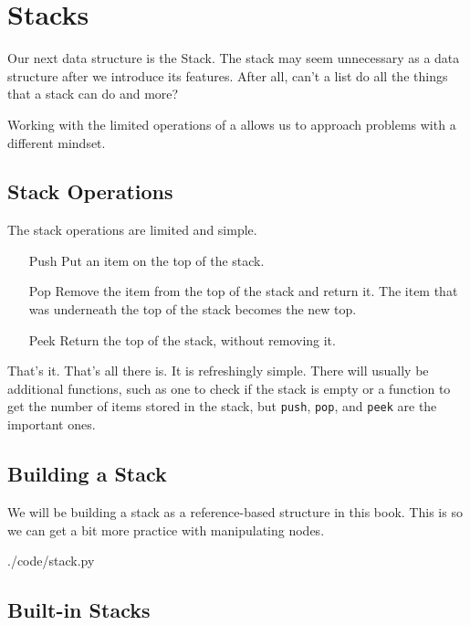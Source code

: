 \chapter{Stacks}
Our next data structure is the Stack.
The stack may seem unnecessary as a data structure after we introduce its features.  
After all, can't a list do all the things that a stack can do and more? 

Working with the limited operations of a allows us to approach problems with a different mindset.

\section{Stack Operations}

The stack operations are limited and simple. 


\begin{enumerate}
	\item[Push] Put an item on the top of the stack.
	\item[Pop]  Remove the item from the top of the stack and return it.  The item that was underneath the top of the stack becomes the new top.
	\item[Peek] Return the top of the stack, without removing it.
\end{enumerate}


That's it.  That's all there is.  It is refreshingly simple.
There will usually be additional functions, such as one to check if the stack is empty or a function to get the number of items stored in the stack, but \texttt{push}, \texttt{pop}, and \texttt{peek} are the important ones.




\section{Building a Stack}

We will be building a stack as a reference-based structure in this book.  This is so we can get a bit more practice with manipulating nodes.


	

\begin{pyfile}{./code/stack.py}
\end{pyfile}

\section{Built-in Stacks}


